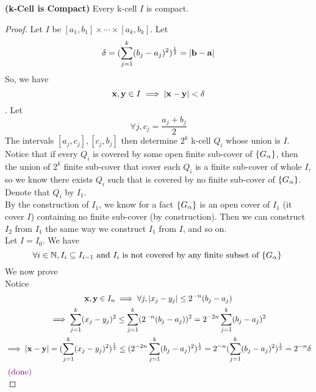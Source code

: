 \documentclass{report}
\begin{document}
\begin{theorem}
\label{2.9.5}
\textbf{(k-Cell is Compact)} Every k-cell $I$ is compact.
\end{theorem}
\begin{proof}
Let $I$ be $[a_1,b_1]\times \cdots \times [a_k,b_k]$. Let
\begin{equation}
\delta=(\sum_{j=1}^k (b_j-a_j)^2)^{\frac{1}{2}}=|\textbf{b}-\textbf{a}|
\end{equation}
So, we have
\begin{equation}
\textbf{x},\textbf{y}\in I\implies |\textbf{x}-\textbf{y}|<\delta
\end{equation}
. Let
\begin{equation}
\forall j, c_j=\frac{a_j+b_j}{2}
\end{equation}
The intervals $[a_j,c_j],[c_j,b_j]$ then determine $2^k$ k-cell $Q_i$ whose union is $I$. Notice that if every $Q_i$ is covered by some open finite sub-cover of $\{ G_\alpha  \}$, then the union of $2^k$ finite sub-cover that cover each $Q_i$ is a finite sub-cover of whole  $I$, so we know there exists  $Q_i$ such that is covered by no finite sub-cover  of $\{ G_\alpha  \}$. Denote that $Q_i$ by $I_1$.\\

By the construction of $I_1$, we know for a fact $\{ G_\alpha  \}$ is an open cover of $I_1$ (it cover $I$) containing no finite sub-cover (by construction). Then we can construct $I_2$ from  $I_1$ the same way we construct $I_1$ from  $I$, and so on.\\
 
Let $I=I_0$. We have 
\begin{equation}
\forall i\in\mathbb{N}, I_i\subseteq I_{i-1}\text{ and $I_i$ is not covered by any finite subset of  $\{ G_\alpha  \}$ }
\end{equation}
We now prove \\

Notice
\begin{gather}
\textbf{x},\textbf{y}\in I_n\implies \forall j, |x_j-y_j|\leq 2^{-n}(b_j-a_j)\\
\implies \sum_{j=1}^k (x_j-y_j)^2 \leq \sum_{j=1}^k (2^{-n}(b_j-a_j))^2=2^{-2n}\sum_{j=1}^k (b_j-a_j)^2\\
\implies |\textbf{x}-\textbf{y}|=(\sum_{j=1}^k (x_j-y_j)^2)^{\frac{1}{2}}\leq (2^{-2n}\sum _{j=1}^k (b_j-a_j)^2)^{\frac{1}{2}}=2^{-n}(\sum _{j=1}^k(b_j-a_j)^2)^{\frac{1}{2}}=2^{-n}\delta
\end{gather}
$\textcolor{violet}{\text{ (done) }}$\\


\end{proof}
\end{document}
